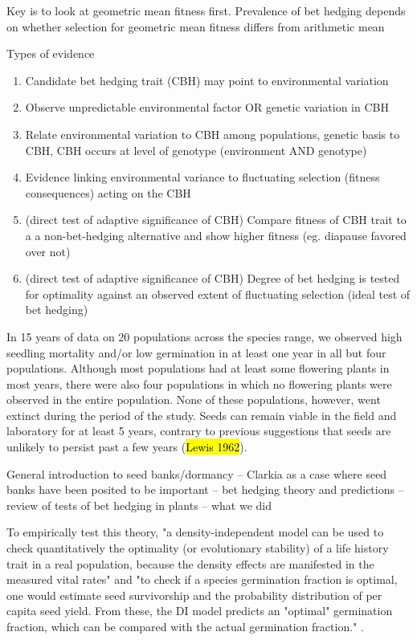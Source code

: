\documentclass[12pt, oneside, titlepage]{article}   	%
\begin{document}
Key is to look at geometric mean fitness first. Prevalence of bet hedging depends on whether selection for geometric mean fitness differs from arithmetic mean

Types of evidence
\begin{enumerate}
\item Candidate bet hedging trait (CBH) may point to environmental variation
\item Observe unpredictable environmental factor OR genetic variation in CBH
\item Relate environmental variation to CBH among populations, genetic basis to CBH, CBH occurs at level of genotype (environment AND genotype)
\item Evidence linking environmental variance to fluctuating selection (fitness consequences) acting on the CBH 
\item (direct test of adaptive significance of CBH) Compare fitness of CBH trait to a a non-bet-hedging alternative and show higher fitness (eg. diapause favored over not)
\item (direct test of adaptive significance of CBH) Degree of bet hedging is tested for optimality against an observed extent of fluctuating selection (ideal test of bet hedging)
\end{enumerate}

In 15 years of data on 20 populations across the species range, we observed high seedling mortality and/or low germination in at least one year in all but four populations. Although most populations had at least some flowering plants in most years, there were also four populations in which no flowering plants were observed in the entire population. None of these populations, however, went extinct during the period of the study. Seeds can remain viable in the field and laboratory for at least 5 years, contrary to previous suggestions that seeds are unlikely to persist past a few years (\hl{Lewis 1962}). 

General introduction to seed banks/dormancy -- Clarkia as a case where seed banks have been posited to be important -- bet hedging theory and predictions -- review of tests of bet hedging in plants -- what we did

To empirically test this theory, "a density-independent model can be used to check quantitatively the optimality (or evolutionary stability) of a life history trait in a real population, because the density effects are manifested in the measured vital rates" and "to check if a species germination fraction is optimal, one would estimate seed survivorship and the probability distribution of per capita seed yield. From these, the DI model predicts an "optimal" germination fraction, which can be compared with the actual germination fraction." \cite{ellner1985a}.
\end{document}
